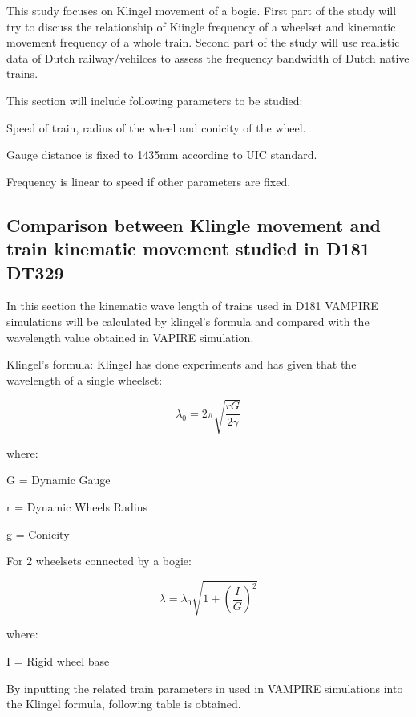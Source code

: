 This  study focuses on Klingel movement of a bogie. First part of the  study will try to discuss the relationship of Kiingle frequency of a wheelset and kinematic movement frequency of a whole train. Second part of the study will use realistic data of Dutch railway/vehilces to assess the frequency bandwidth of Dutch native trains.

This section will include following parameters to be studied:

Speed of train, radius of the wheel and conicity of the wheel. 

Gauge distance is fixed to 1435mm according to UIC standard. 

Frequency is linear to speed if other parameters are fixed.

\subsection{Comparison between Klingle movement and train kinematic movement studied in D181 DT329}

In this section the kinematic wave length of trains used in D181 VAMPIRE simulations will be calculated by klingel's formula and compared with the wavelength value obtained in VAPIRE simulation.

Klingel's formula:
Klingel has done experiments and has given that the wavelength of a single wheelset:

$$ \lambda_0 = 2 \pi \sqrt{\frac{rG}{2\gamma} }$$

where:

G = Dynamic Gauge

r = Dynamic Wheels Radius

g = Conicity

For 2 wheelsets connected by a bogie:

$$ \lambda = \lambda_0 \sqrt{1+(\frac{I}{G})^2}  $$

where:

I = Rigid wheel base

By inputting the related train parameters in used in VAMPIRE simulations into the Klingel formula, following table is obtained.


